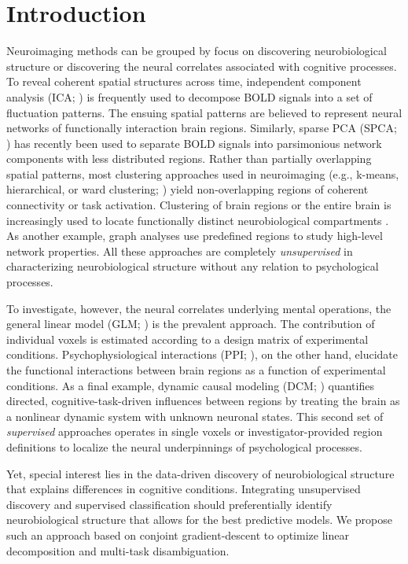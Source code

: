 \documentclass[10pt, conference, compsocconf]{IEEEtran}
\begin{document}
\section{Introduction}
%
Neuroimaging methods can be grouped by focus on discovering
neurobiological structure or discovering the neural correlates associated
with cognitive processes.
To reveal coherent spatial structures across time,
independent component analysis (ICA; \citep{beckmann2005}) is frequently used
to decompose BOLD signals into a
set of fluctuation patterns. 
The ensuing spatial patterns are believed to represent neural networks of
functionally interaction brain regions.
Similarly, sparse PCA (SPCA; \citep{varoqu2011}) has recently been used to
separate BOLD signals into parsimonious
network components with less distributed regions.
Rather than partially overlapping spatial patterns, most clustering
approaches used in neuroimaging (e.g., k-means, hierarchical, or ward clustering;
\citep{thirion14}) yield non-overlapping regions of coherent connectivity
or task activation.
Clustering of brain regions or the entire brain is increasingly used to 
locate functionally distinct neurobiological compartments \citep{behrens03}.
As another example, graph analyses \citep{bullmore09} use predefined
regions to study high-level network properties.
All these approaches are completely \textit{unsupervised} in
characterizing neurobiological structure without any relation to
psychological processes.
\linebreak

To investigate, however, the neural correlates underlying mental operations,
the general linear model (GLM; \citep{friston94}) is the prevalent approach.
The contribution of
individual voxels is estimated according to a design matrix of experimental
conditions. Psychophysiological interactions (PPI; \citep{friston97}),
on the other hand,
elucidate the functional interactions between brain regions as a function
of experimental conditions. As a final example, 
dynamic causal modeling (DCM; \citep{stephan04}) quantifies directed,
cognitive-task-driven influences between regions
by treating the brain as a nonlinear dynamic system with unknown
neuronal states. This second set of \textit{supervised} approaches
operates in single voxels or
investigator-provided region definitions to localize the neural underpinnings of
psychological processes.
\linebreak

Yet, special interest lies in the data-driven
discovery of neurobiological structure that explains differences
in cognitive conditions. Integrating unsupervised discovery and
supervised classification should preferentially identify
neurobiological structure that allows for the best predictive models. We
propose such an approach based on conjoint gradient-descent to optimize
linear decomposition and multi-task disambiguation.
\end{document}
